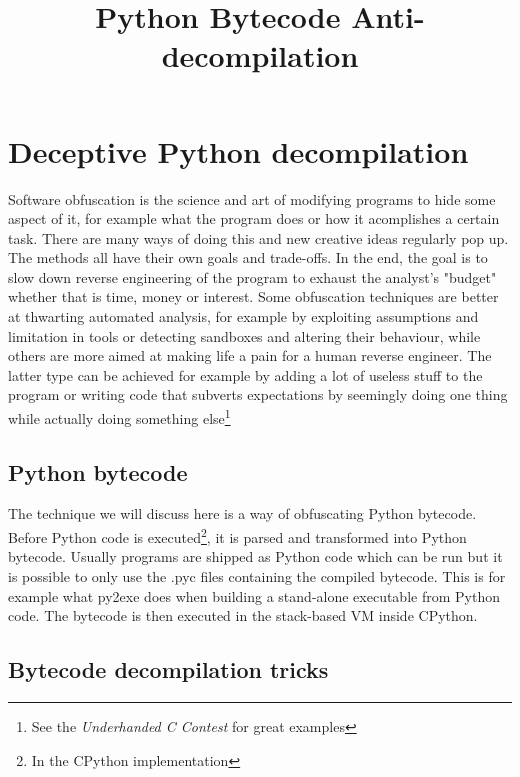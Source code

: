 \documentclass[twocolumn]{article}
\begin{document}
\title{Python Bytecode Anti-decompilation}
\date{}
\section*{Deceptive Python decompilation}

\vspace*{-1\baselineskip}

Software obfuscation is the science and art of modifying programs to hide some aspect of it, for example what the program does or how it acomplishes a certain task. There are many ways of doing this and new creative ideas regularly pop up. The methods all have their own goals and trade-offs. In the end, the goal is to slow down reverse engineering of the program to exhaust the analyst's "budget" whether that is time, money or interest. Some obfuscation techniques are better at thwarting automated analysis, for example by exploiting assumptions and limitation in tools or detecting sandboxes and altering their behaviour, while others are more aimed at making life a pain for a human reverse engineer. The latter type can be achieved for example by adding a lot of useless stuff to the program or writing code that subverts expectations by seemingly doing one thing while actually doing something else\footnote{See the \textit{Underhanded C Contest} for great examples}

\vspace*{-1.3\baselineskip}

\subsection*{Python bytecode}

The technique we will discuss here is a way of obfuscating Python bytecode. Before Python code is executed\footnote{In the CPython implementation}, it is parsed and transformed into Python bytecode. Usually programs are shipped as Python code which can be run but it is possible to only use the .pyc files containing the compiled bytecode. This is for example what py2exe does when building a stand-alone executable from Python code. The bytecode is then executed in the stack-based VM inside CPython.

\vspace*{-1.3\baselineskip}

\subsection*{Bytecode decompilation tricks}
\end{document}
